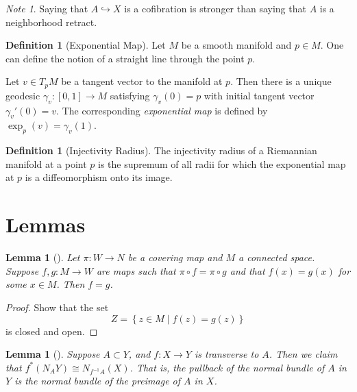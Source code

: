 \documentclass[reqno]{amsart}
\newtheorem{lemma}[theorem]{Lemma}
\theoremstyle{definition}
\newtheorem{definition}[theorem]{Definition}
\theoremstyle{remark}
\newtheorem*{note}{Note}
\begin{document}
\begin{note}
    Saying that $A \hookrightarrow X$ is a cofibration
    is stronger than saying that $A$ is a neighborhood retract.
\end{note}



\begin{definition}[Exponential Map]
    Let $M$ be a smooth manifold and
    $p \in M$. One can define the notion of a straight line
    through the point $p$.

    Let $v \in T_pM$ be a tangent vector to the manifold
    at $p$. Then there is a unique geodesic 
    $\gamma_v \colon \left[ 0,1 \right] \to M$ satisfying
    $\gamma_v (0) = p$ with initial tangent vector
    $\gamma_v' (0) = v$.
    The corresponding \textit{exponential map} is defined
    by $\exp_p (v) = \gamma_v(1)$.
\end{definition}

\begin{definition}[Injectivity Radius]
      The injectivity
      radius of a Riemannian manifold at a point $p$
      is the supremum of
      all radii for which the exponential map
      at $p$ is a diffeomorphism onto its image.
\end{definition}



\section{Lemmas}

\begin{lemma}[]\label{Lemma:XIOOQLSJ}
    Let $\pi \colon W \to N$ be a covering map and
    $M$ a connected space. Suppose
    $f,g \colon M \to W$ are maps such that
    $\pi \circ f = \pi \circ g$ and that
    $f(x) = g(x)$ for some $x \in M$. Then
    $f = g$.
\end{lemma}

\begin{proof}
    Show that the set
    \[
    Z = \left\{ z \in M  \mid f(z) = g(z)\right\} 
    \] 
    is closed and open.
\end{proof}

\begin{lemma}[]\label{Lemma:Pullback-Of-Normal-Bundle}
    Suppose $A \subset Y$, and  $f \colon X \to Y$ is transverse to 
    $A$. Then we claim that
    $f^{*}\left( N_A Y \right) \cong 
    N_{f^{-1}A}(X)$. That is, the pullback of the normal bundle
    of $A$ in $Y$ is the normal bundle of the preimage of $A$ in $X$.
\end{lemma}
\end{document}
